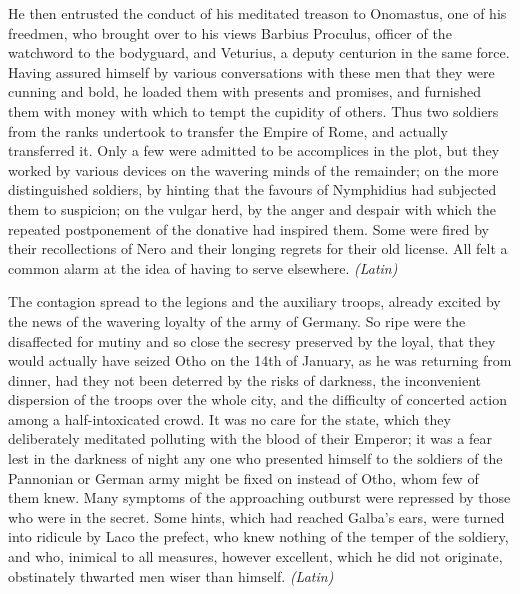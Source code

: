 He then entrusted the conduct of his meditated treason to Onomastus, one of his freedmen, who brought over to his views Barbius Proculus, officer of the watchword to the bodyguard, and Veturius, a deputy centurion in the same force. Having assured himself by various conversations with these men that they were cunning and bold, he loaded them with presents and promises, and furnished them with money with which to tempt the cupidity of others. Thus two soldiers from the ranks undertook to transfer the Empire of Rome, and actually transferred it. Only a few were admitted to be accomplices in the plot, but they worked by various devices on the wavering minds of the remainder; on the more distinguished soldiers, by hinting that the favours of Nymphidius had subjected them to suspicion; on the vulgar herd, by the anger and despair with which the repeated postponement of the donative had inspired them. Some were fired by their recollections of Nero and their longing regrets for their old license. All felt a common alarm at the idea of having to serve elsewhere. \emph{(Latin)}


The contagion spread to the legions and the auxiliary troops, already excited by the news of the wavering loyalty of the army of Germany. So ripe were the disaffected for mutiny and so close the secresy preserved by the loyal, that they would actually have seized Otho on the 14th of January, as he was returning from dinner, had they not been deterred by the risks of darkness, the inconvenient dispersion of the troops over the whole city, and the difficulty of concerted action among a half-intoxicated crowd. It was no care for the state, which they deliberately meditated polluting with the blood of their Emperor; it was a fear lest in the darkness of night any one who presented himself to the soldiers of the Pannonian or German army might be fixed on instead of Otho, whom few of them knew. Many symptoms of the approaching outburst were repressed by those who were in the secret. Some hints, which had reached Galba's ears, were turned into ridicule by Laco the prefect, who knew nothing of the temper of the soldiery, and who, inimical to all measures, however excellent, which he did not originate, obstinately thwarted men wiser than himself. \emph{(Latin)}



